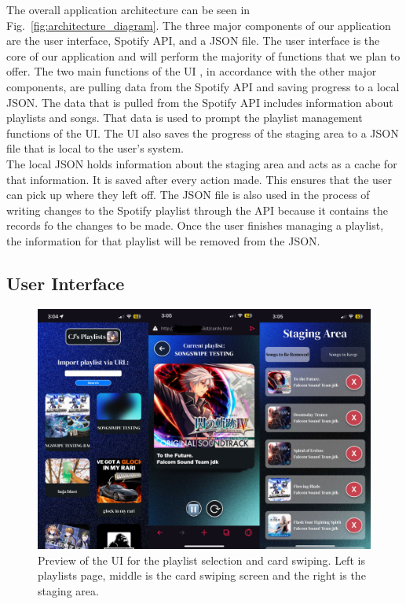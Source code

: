 \documentclass{article}
\begin{document}
\quad The overall application architecture can be seen in Fig.~\ref{fig:architecture_diagram}. The three major components of our application are the user interface, Spotify API, and a JSON file. The user interface is the core of our application and will perform the majority of functions that we plan to offer. The two main functions of the UI , in accordance with the other major components, are pulling data from the Spotify API and saving progress to a local JSON. The data that is pulled from the Spotify API includes information about playlists and songs. That data is used to prompt the playlist management functions of the UI. The UI also saves the progress of the staging area to a JSON file that is local to the user’s system.\\

\quad The local JSON holds information about the staging area and acts as a cache for that information. It is saved after every action made. This ensures that the user can pick up where they left off. The JSON file is also used in the process of writing changes to the Spotify playlist through the API because it contains the records fo the changes to be made. Once the user finishes managing a playlist, the information for that playlist will be removed from the JSON.

\subsection{User Interface}
\begin{figure}[ht]
  \centering
  \captionsetup{justification=centering}
  \includegraphics[width=5in,scale=4]{./ui-draft.png}
  \caption{Preview of the UI for the playlist selection and card swiping. Left is playlists page, middle is the card swiping screen and the right is the staging area. }
  \label{fig:ui_preview}
\end{figure}
\end{document}
